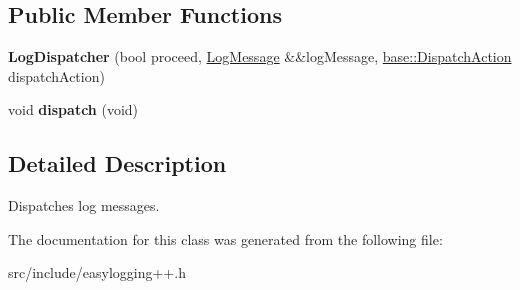 \subsection*{Public Member Functions}
\begin{DoxyCompactItemize}
\item 
\mbox{\label{classel_1_1base_1_1_log_dispatcher_aef59d9895c348f0b3ad5a776276f1c22}} 
{\bfseries Log\+Dispatcher} (bool proceed, \hyperlink{classel_1_1_log_message}{Log\+Message} \&\&log\+Message, \hyperlink{namespaceel_1_1base_a3aa2563d38e47388ba242a1694fc2839}{base\+::\+Dispatch\+Action} dispatch\+Action)
\item 
\mbox{\label{classel_1_1base_1_1_log_dispatcher_a88d4a644364bb454136c85338f05da7a}} 
void {\bfseries dispatch} (void)
\end{DoxyCompactItemize}


\subsection{Detailed Description}
Dispatches log messages. 

The documentation for this class was generated from the following file\+:\begin{DoxyCompactItemize}
\item 
src/include/easylogging++.\+h\end{DoxyCompactItemize}
